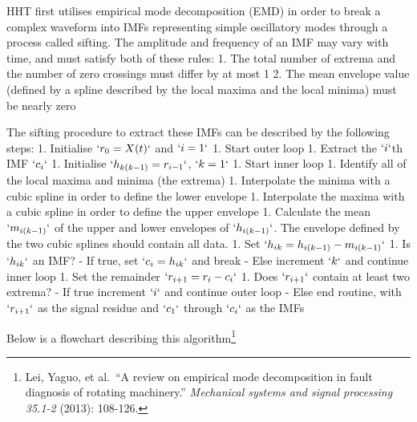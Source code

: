 \documentclass[
  english,
  paper=a4,
  oneside  ,captions=tableheading
]{scrbook}
\begin{document}
HHT first utilises empirical mode decomposition (EMD) in order to break
a complex waveform into IMFs representing simple oscillatory modes
through a process called sifting. The amplitude and frequency of an IMF
may vary with time, and must satisfy both of these rules: 1. The total
number of extrema and the number of zero crossings must differ by at
most 1 2. The mean envelope value (defined by a spline described by the
local maxima and the local minima) must be nearly zero

The sifting procedure to extract these IMFs can be described by the
following steps: 1. Initialise \(`r_0 = X(t)`\) and \(`i = 1`\) 1. Start
outer loop 1. Extract the \(`i`\)th IMF \(`c_i`\) 1. Initialise
\(`h_{k(k-1)} = r_{i-1}`\), \(`k = 1`\) 1. Start inner loop 1. Identify
all of the local maxima and minima (the extrema) 1. Interpolate the
minima with a cubic spline in order to define the lower envelope 1.
Interpolate the maxima with a cubic spline in order to define the upper
envelope 1. Calculate the mean \(`m_{i(k-1)}`\) of the upper and lower
envelopes of \(`h_{i(k-1)}`\). The envelope defined by the two cubic
splines should contain all data. 1. Set
\(`h_{ik} = h_{i(k-1)} - m_{i(k-1)}`\) 1. Is \(`h_{ik}`\) an IMF? - If
true, set \(`c_i = h_{ik}`\) and break - Else increment \(`k`\) and
continue inner loop 1. Set the remainder \(`r_{i+1} = r_i - c_i`\) 1.
Does \(`r_{i + 1}`\) contain at least two extrema? - If true increment
\(`i`\) and continue outer loop - Else end routine, with \(`r_{i + 1}`\)
as the signal residue and \(`c_1`\) through \(`c_i`\) as the IMFs

Below is a flowchart describing this algorithm\footnote{Lei, Yaguo, et
  al.~``A review on empirical mode decomposition in fault diagnosis of
  rotating machinery.'' \emph{Mechanical systems and signal processing
  35.1-2} (2013): 108-126.}
\end{document}

